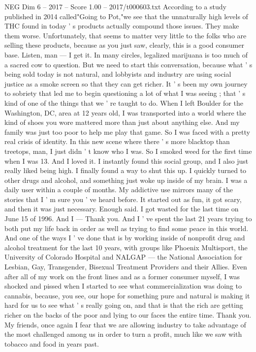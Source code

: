 \begin{textsample}{NEG Dim 6 – 2017 – Score 1.00 – 2017/t000603.txt}
According to a study published in 2014 called"Going to Pot,"we see that the unnaturally high levels of THC found in today ' s products actually compound those issues.
They make them worse.
Unfortunately, that seems to matter very little to the folks who are selling these products, because as you just saw, clearly, this is a good consumer base.
Listen, man — I get it.
In many circles, legalized marijuana is too much of a sacred cow to question.
But we need to start this conversation, because what ' s being sold today is not natural, and lobbyists and industry are using social justice as a smoke screen so that they can get richer.
It ' s been my own journey to sobriety that led me to begin questioning a lot of what I was seeing ; that ' s kind of one of the things that we ' re taught to do.
When I left Boulder for the Washington, DC, area at 12 years old, I was transported into a world where the kind of shoes you wore mattered more than just about anything else.
And my family was just too poor to help me play that game.
So I was faced with a pretty real crisis of identity.
In this new scene where there ' s more blacktop than treetops, man, I just didn ' t know who I was.
So I smoked weed for the first time when I was 13.
And I loved it.
I instantly found this social group, and I also just really liked being high.
I finally found a way to shut this up.
I quickly turned to other drugs and alcohol, and something just woke up inside of my brain.
I was a daily user within a couple of months.
My addictive use mirrors many of the stories that I ' m sure you ' ve heard before.
It started out as fun, it got scary, and then it was just necessary.
Enough said.
I got wasted for the last time on June 15 of 1996.
And I — Thank you.
And I ' ve spent the last 21 years trying to both put my life back in order as well as trying to find some peace in this world.
And one of the ways I ' ve done that is by working inside of nonprofit drug and alcohol treatment for the last 10 years, with groups like Phoenix Multisport, the University of Colorado Hospital and NALGAP — the National Association for Lesbian, Gay, Transgender, Bisexual Treatment Providers and their Allies.
Even after all of my work on the front lines and as a former consumer myself, I was shocked and pissed when I started to see what commercialization was doing to cannabis, because, you see, our hope for something pure and natural is making it hard for us to see what ' s really going on, and that is that the rich are getting richer on the backs of the poor and lying to our faces the entire time.
Thank you.
My friends, once again I fear that we are allowing industry to take advantage of the most challenged among us in order to turn a profit, much like we saw with tobacco and food in years past.

\end{textsample}
